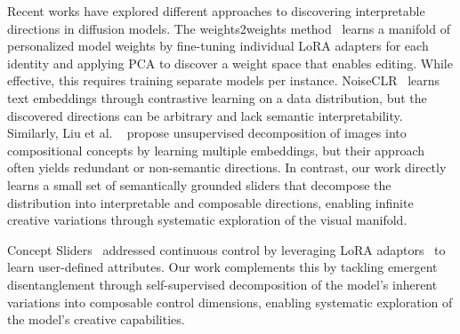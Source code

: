 Recent works have explored different approaches to discovering interpretable directions in diffusion models. The weights2weights method~\cite{dravid2024interpreting} learns a manifold of personalized model weights by fine-tuning individual LoRA adapters for each identity and applying PCA to discover a weight space that enables editing. While effective, this requires training separate models per instance. NoiseCLR~\cite{dalva2024noiseclr} learns text embeddings through contrastive learning on a data distribution, but the discovered directions can be arbitrary and lack semantic interpretability. Similarly, Liu et al. ~\cite{liu2023unsupervised} propose unsupervised decomposition of images into compositional concepts by learning multiple embeddings, but their approach often yields redundant or non-semantic directions. In contrast, our work directly learns a small set of semantically grounded sliders that decompose the distribution into interpretable and composable directions, enabling infinite creative variations through systematic exploration of the visual manifold.




Concept Sliders~\cite{gandikota2023concept} addressed continuous control by leveraging LoRA adaptors~\cite{hu2021lora} to learn user-defined attributes. Our work complements this by tackling emergent disentanglement through self-supervised decomposition of the model's inherent variations into composable control dimensions, enabling systematic exploration of the model's creative capabilities.


